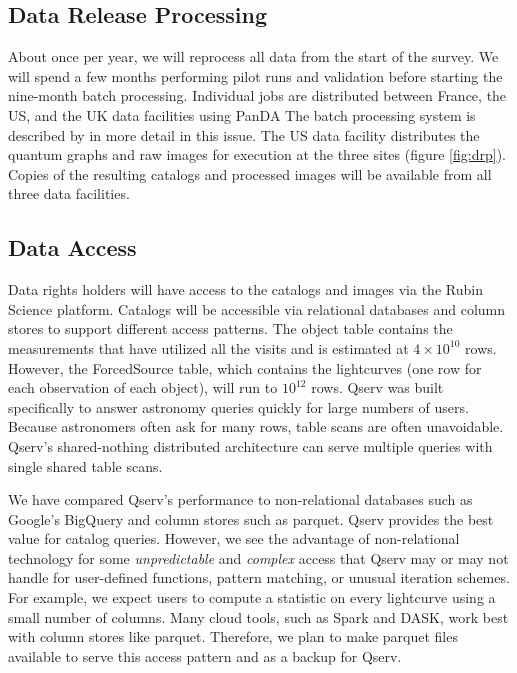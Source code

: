 \documentclass[11pt,twoside]{article}
\begin{document}
\subsection{Data Release Processing}\label{sec:DRP}
About once per year, we will reprocess all data from the start of the survey.
We will spend a few months performing pilot runs and validation before starting the nine-month batch processing.
Individual jobs are distributed between France, the US, and the UK data facilities using PanDA \citep{DMTN-213}
The batch processing system is described by \citet{P52_adassxxxii} in more detail in this issue.
The US data facility distributes the quantum graphs and raw images for execution at the three sites (figure \ref{fig:drp}).
Copies of the resulting catalogs and processed images will be available from all three data facilities.

\begin{centering}
\end{centering}


\subsection{Data Access} \label{sec:dataaccess}

Data rights holders will have access to the catalogs and images via the Rubin Science platform.
Catalogs will be accessible via relational databases and column stores to support different access patterns.
The object table contains the measurements that have utilized all the visits and is estimated at $4 \times 10^{10}$ rows.
However, the ForcedSource table, which contains the lightcurves (one row for each observation of each object), will run to $10^{12}$ rows.
Qserv \citep{C15_adassxxxii} was built specifically to answer astronomy queries quickly for large numbers of users.
Because astronomers often ask for many rows, table scans are often unavoidable.
Qserv's shared-nothing distributed architecture can serve multiple queries with single shared table scans.

We have compared Qserv's performance to non-relational databases such as Google's BigQuery \citet[e.g.,][]{Document-31100} and column stores such as parquet.
Qserv provides the best value for catalog queries.
However, we see the advantage of non-relational technology for
some \emph{unpredictable} and \emph{complex} access that Qserv may or may not handle for user-defined functions, pattern matching, or unusual iteration schemes.
For example, we expect users to compute a statistic on every lightcurve using a small number of columns.
Many cloud tools, such as Spark and DASK, work best with column stores like parquet.
Therefore, we plan to make parquet files available to serve this access pattern and as a backup for Qserv.
\end{document}
